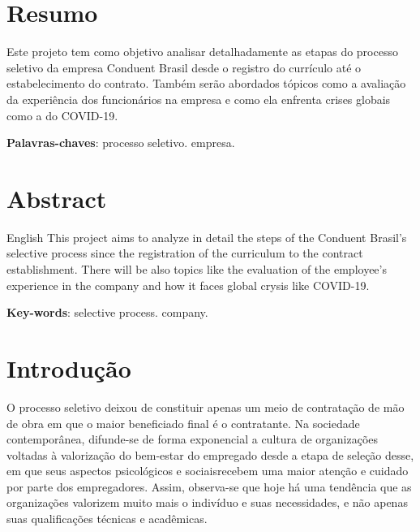 \documentclass[12pt]{article}
\begin{document}

\newpage

\newpage
\tableofcontents




\newpage






\section*{Resumo}

Este projeto tem como objetivo analisar detalhadamente as etapas do processo seletivo da empresa Conduent Brasil desde o registro do currículo até o estabelecimento do contrato. Também serão abordados tópicos como a avaliação da experiência dos funcionários na empresa e como ela enfrenta crises globais como a do COVID-19.

\textbf
{Palavras-chaves}: processo seletivo. empresa.


\newpage


\section*{Abstract}



 \begin{otherlanguage*}{English}
  This project aims to analyze in detail the steps of the Conduent Brasil's selective process since the registration of the curriculum to the contract establishment. There will be also topics like the evaluation of the employee's experience in the company and how it faces global crysis like COVID-19.

  
 
   \noindent 
   \textbf{Key-words}: selective process. company.
 \end{otherlanguage*}


\newpage


\section{Introdução}

O processo seletivo deixou de constituir apenas um meio de contratação de mão de obra em que o maior beneficiado final é o contratante. Na sociedade contemporânea, difunde-se de forma exponencial a cultura de organizações voltadas à valorização do bem-estar do empregado desde a etapa de seleção desse, em que seus aspectos psicológicos e sociaisrecebem uma maior atenção e cuidado por parte dos empregadores. Assim, observa-se que hoje há uma tendência que as organizações valorizem muito mais o indivíduo e suas necessidades, e não apenas suas qualificações técnicas e acadêmicas.
\end{document}
